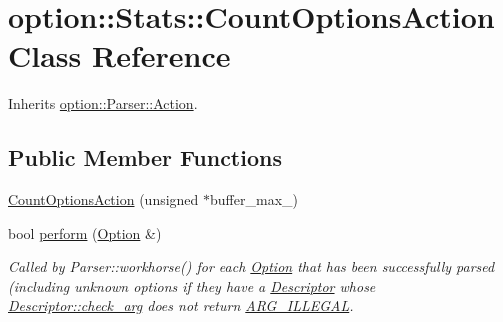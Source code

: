 \hypertarget{classoption_1_1_stats_1_1_count_options_action}{\section{option\-:\-:\-Stats\-:\-:\-Count\-Options\-Action \-Class \-Reference}
\label{classoption_1_1_stats_1_1_count_options_action}
}


\-Inherits \hyperlink{structoption_1_1_parser_1_1_action}{option\-::\-Parser\-::\-Action}.

\subsection*{\-Public \-Member \-Functions}
\begin{DoxyCompactItemize}
\item 
\hyperlink{classoption_1_1_stats_1_1_count_options_action_a24a38b87ad129b0e12660bd2019ba284}{\-Count\-Options\-Action} (unsigned $\ast$buffer\-\_\-max\-\_\-)
\item 
bool \hyperlink{classoption_1_1_stats_1_1_count_options_action_a29ab8a68d0a30736b99b4d2e5dece489}{perform} (\hyperlink{classoption_1_1_option}{\-Option} \&)
\begin{DoxyCompactList}\small\item\em \-Called by \-Parser\-::workhorse() for each \hyperlink{classoption_1_1_option}{\-Option} that has been successfully parsed (including unknown options if they have a \hyperlink{structoption_1_1_descriptor}{\-Descriptor} whose \hyperlink{structoption_1_1_descriptor_aa5d675dba0214a4abd73007ff163cc67}{\-Descriptor\-::check\-\_\-arg} does not return \hyperlink{namespaceoption_aee8c76a07877335762631491e7a5a1a9a9528e32563b795bd2930b12d0a5e382d}{\-A\-R\-G\-\_\-\-I\-L\-L\-E\-G\-A\-L}. \end{DoxyCompactList}\end{DoxyCompactItemize}


